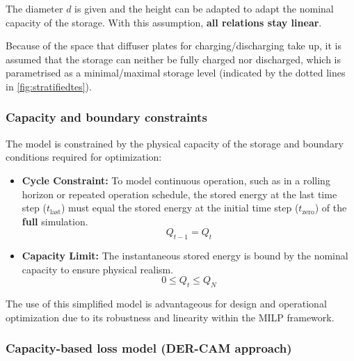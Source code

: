 \documentclass[11pt,a4paper]{report}
\begin{document}
The diameter $d$ is given and the height can be adapted to adapt the nominal capacity of the storage. With this assumption,\textbf{ all relations stay linear}.

Because of the space that diffuser plates for charging/discharging take up, it is assumed that the storage can neither be fully charged nor discharged, which is parametrised as a minimal/maximal storage level (indicated by the dotted lines in \ref{fig:stratifiedtes}).



\subsubsection{Capacity and boundary constraints}
The model is constrained by the physical capacity of the storage and boundary conditions required for optimization:

\begin{itemize}
\item \textbf{Cycle Constraint:} To model continuous operation, such as in a rolling horizon or repeated operation schedule, the stored energy at the last time step ($t_{\text{last}}$) must equal the stored energy at the initial time step ($t_{\text{zero}}$) of the \textbf{full} simulation.
 \begin{equation}
 Q_{t-1} = Q_{t}
\tag{10}
 \end{equation}

\item \textbf{Capacity Limit:} The instantaneous stored energy is bound by the nominal capacity to ensure physical realism.
\begin{equation}
0 \le Q_{t} \le Q_N
 \tag{11}
 \end{equation}
\end{itemize}

\vspace{0.5cm}

The use of this simplified model is advantageous for design and operational optimization due to its robustness and linearity within the MILP framework.

\subsubsection{Capacity-based loss model (DER-CAM approach)}
\label{sub:dercam_tes}
\end{document}
